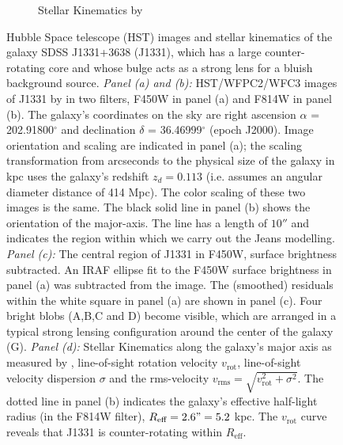 \begin{figure}
\begin{subfigure}{.5\textwidth}
  \caption{Stellar Kinematics by \citet{SWELLSV}}
  \label{fig:kinematics}
\end{subfigure}
\caption{Hubble Space telescope (HST) images and stellar kinematics of the galaxy SDSS J1331+3638 (J1331), which has a large counter-rotating core and whose bulge acts as a strong lens for a bluish background source. \emph{Panel (a) and (b):} HST/WFPC2/WFC3 images of J1331 by \citet{SWELLSI} in two filters, F450W in panel (a) and F814W in panel (b). The galaxy's coordinates on the sky are right ascension $\alpha$ = 202.91800$^\circ$ and declination $\delta$ = 36.46999$^\circ$ (epoch J2000). Image orientation and scaling are indicated in panel (a); the scaling transformation from arcseconds to the physical size of the galaxy in kpc uses the galaxy's redshift $z_d = 0.113$ \citep{SWELLSIII} (i.e. assumes an angular diameter distance of 414 Mpc). The color scaling of these two images is the same. The black solid line in panel (b) shows the orientation of the major-axis. The line has a length of $10''$ and indicates the region within which we carry out the Jeans modelling. \emph{Panel (c):} The central region of J1331 in F450W, surface brightness subtracted. An IRAF ellipse  fit to the F450W surface brightness in panel (a) was subtracted from the image. The (smoothed) residuals within the white square in panel (a) are shown in panel (c). Four bright blobs (A,B,C and D) become visible, which are arranged in a typical strong lensing configuration around the center of the galaxy (G). \emph{Panel (d):} Stellar Kinematics along the galaxy's major axis as measured by \citet{SWELLSV}, line-of-sight rotation velocity $v_\text{rot}$, line-of-sight velocity dispersion $\sigma$ and the rms-velocity $v_\text{rms} = \sqrt{v_\text{rot}^2 + \sigma^2}$. The dotted line in panel (b) indicates the galaxy's effective half-light radius (in the F814W filter), $R_\text{eff} = 2.6" = 5.2$ kpc. The $v_\text{rot}$ curve reveals that J1331 is counter-rotating within $R_\text{eff}$.  }
\label{fig:specialJ1331}
\end{figure}